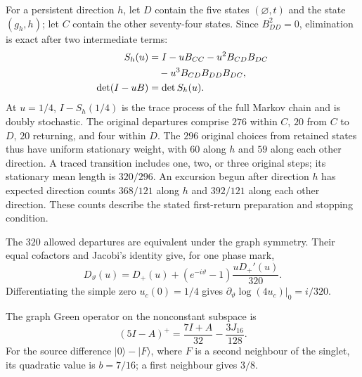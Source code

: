 \documentclass[aps,prx,reprint,longbibliography]{revtex4-2}
\begin{document}
For a persistent direction $h$, let $D$ contain the five states $(\varnothing,t)$ and the state $(g_h,h)$; let $C$ contain the other seventy-four states. Since $B_{DD}^2=0$, elimination is exact after two intermediate terms:
\begin{align}
 S_h(u)&=I-uB_{CC}-u^2B_{CD}B_{DC}\notag\\
 &\quad-u^3B_{CD}B_{DD}B_{DC},\notag\\
 \det(I-uB)&=\det S_h(u).
 \label{ap:traceprocess}
\end{align}
At $u=1/4$, $I-S_h(1/4)$ is the trace process of the full Markov chain and is doubly stochastic. The original departures comprise $276$ within $C$, $20$ from $C$ to $D$, $20$ returning, and four within $D$. The $296$ original choices from retained states thus have uniform stationary weight, with $60$ along $h$ and $59$ along each other direction. A traced transition includes one, two, or three original steps; its stationary mean length is $320/296$. An excursion begun after direction $h$ has expected direction counts $368/121$ along $h$ and $392/121$ along each other direction. These counts describe the stated first-return preparation and stopping condition.

The $320$ allowed departures are equivalent under the graph symmetry. Their equal cofactors and Jacobi's identity give, for one phase mark,
\begin{equation}
 D_\vartheta(u)=D_+(u)
 +(e^{-i\vartheta}-1)\frac{uD_+'(u)}{320}.
 \label{ap:marked}
\end{equation}
Differentiating the simple zero $u_c(0)=1/4$ gives $\partial_\vartheta\log(4u_c)|_0=i/320$.

The graph Green operator on the nonconstant subspace is
\begin{equation}
 (5I-A)^+=\frac{7I+A}{32}-\frac{3J_{16}}{128}.
 \label{ap:resistance}
\end{equation}
For the source difference $|0\rangle-|F\rangle$, where $F$ is a second neighbour of the singlet, its quadratic value is $b=7/16$; a first neighbour gives $3/8$.
\end{document}
